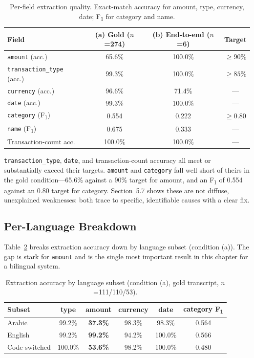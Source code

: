 \begin{table}[H]
\centering
\caption{Per-field extraction quality. Exact-match accuracy for amount, type, currency, date; F\textsubscript{1} for category and name.}
\label{tab:extract-main}
\small
\renewcommand{\arraystretch}{1.3}
\begin{tabularx}{\textwidth}{X c c c}
\toprule
\textbf{Field} & \textbf{(a) Gold ($n$=274)} & \textbf{(b) End-to-end ($n$=6)} & \textbf{Target} \\
\midrule
\texttt{amount} (acc.)            & 65.6\% & 100.0\% & $\geq 90\%$ \\
\texttt{transaction\_type} (acc.) & 99.3\% & 100.0\% & $\geq 85\%$ \\
\texttt{currency} (acc.)          & 96.6\% & 71.4\%  & --- \\
\texttt{date} (acc.)              & 99.3\% & 100.0\% & --- \\
\texttt{category} (F\textsubscript{1}) & 0.554 & 0.222 & $\geq 0.80$ \\
\texttt{name} (F\textsubscript{1})     & 0.675 & 0.333 & --- \\
\midrule
Transaction-count acc.            & 100.0\% & 100.0\% & --- \\
\bottomrule
\end{tabularx}
\end{table}

\texttt{transaction\_type}, \texttt{date}, and transaction-count accuracy all
meet or substantially exceed their targets. \texttt{amount} and
\texttt{category} fall well short of theirs in the gold condition---65.6\%
against a 90\% target for amount, and an F\textsubscript{1} of 0.554 against an
0.80 target for category. Section~5.7 shows these are not diffuse, unexplained
weaknesses: both trace to specific, identifiable causes with a clear fix.

\subsection{Per-Language Breakdown}

Table~\ref{tab:extract-lang} breaks extraction accuracy down by language subset
(condition (a)). The gap is stark for \texttt{amount} and is the single most
important result in this chapter for a bilingual system.

\begin{table}[H]
\centering
\caption{Extraction accuracy by language subset (condition (a), gold transcript, $n$=111/110/53).}
\label{tab:extract-lang}
\small
\renewcommand{\arraystretch}{1.3}
\begin{tabularx}{\textwidth}{X c c c c c}
\toprule
\textbf{Subset} & \textbf{type} & \textbf{amount} & \textbf{currency} & \textbf{date} & \textbf{category F\textsubscript{1}} \\
\midrule
Arabic        & 99.2\%  & \textbf{37.3\%} & 98.3\% & 98.3\%  & 0.564 \\
English       & 99.2\%  & \textbf{99.2\%} & 94.2\% & 100.0\% & 0.566 \\
Code-switched & 100.0\% & \textbf{53.6\%} & 98.2\% & 100.0\% & 0.480 \\
\bottomrule
\end{tabularx}
\end{table}

